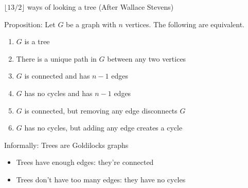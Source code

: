 \documentclass{beamer}
\begin{document}
\begin{frame}{$\lfloor 13/2\rfloor$ ways of looking a tree (After Wallace Stevens)}
  \begin{block}{Proposition:} Let $G$ be a graph with $n$ vertices.  The following are equivalent.
    \begin{enumerate}
    \item $G$ is a tree
    \item There is a unique path in $G$ between any two vertices
    \item $G$ is connected and has $n-1$ edges
    \item $G$ has no cycles and has $n-1$ edges
    \item $G$ is connected, but removing any edge disconnects $G$
    \item $G$ has no cycles, but adding any edge creates a cycle
      \end{enumerate}
  \end{block}
  \begin{block}{Informally: Trees are Goldilocks graphs}
    \begin{itemize}
\item    Trees have enough edges: they're connected \\
\item    Trees don't have too many edges: they have no cycles
  \end{itemize}
\end{block}

\end{frame}
\end{document}
